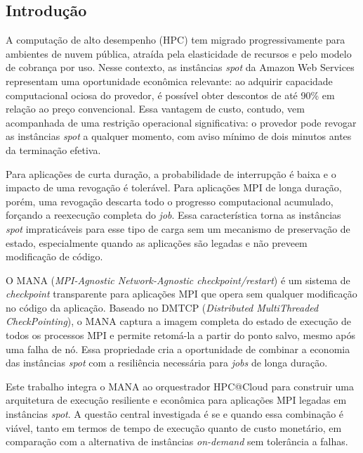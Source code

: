 \begin{resumo}

\section*{Introdução}

A computação de alto desempenho (HPC) tem migrado progressivamente para
ambientes de nuvem pública, atraída pela elasticidade de recursos e pelo modelo
de cobrança por uso. Nesse contexto, as instâncias \textit{spot} da Amazon Web
Services representam uma oportunidade econômica relevante: ao adquirir
capacidade computacional ociosa do provedor, é possível obter descontos de até
90\% em relação ao preço convencional. Essa vantagem de custo, contudo, vem
acompanhada de uma restrição operacional significativa: o provedor pode revogar
as instâncias \textit{spot} a qualquer momento, com aviso mínimo de dois
minutos antes da terminação efetiva.

Para aplicações de curta duração, a probabilidade de interrupção é baixa e o
impacto de uma revogação é tolerável. Para aplicações MPI de longa duração,
porém, uma revogação descarta todo o progresso computacional acumulado, forçando
a reexecução completa do \textit{job}. Essa característica torna as instâncias
\textit{spot} impraticáveis para esse tipo de carga sem um mecanismo de
preservação de estado, especialmente quando as aplicações são legadas e não
preveem modificação de código.

O MANA (\textit{MPI-Agnostic Network-Agnostic checkpoint/restart}) é um sistema
de \textit{checkpoint} transparente para aplicações MPI que opera sem qualquer
modificação no código da aplicação. Baseado no DMTCP (\textit{Distributed
MultiThreaded CheckPointing}), o MANA captura a imagem completa do estado de
execução de todos os processos MPI e permite retomá-la a partir do ponto salvo,
mesmo após uma falha de nó. Essa propriedade cria a oportunidade de combinar a
economia das instâncias \textit{spot} com a resiliência necessária para
\textit{jobs} de longa duração.

Este trabalho integra o MANA ao orquestrador HPC@Cloud para construir uma
arquitetura de execução resiliente e econômica para aplicações MPI legadas em
instâncias \textit{spot}. A questão central investigada é se e quando essa
combinação é viável, tanto em termos de tempo de execução quanto de custo
monetário, em comparação com a alternativa de instâncias \textit{on-demand} sem
tolerância a falhas.



\end{resumo}

